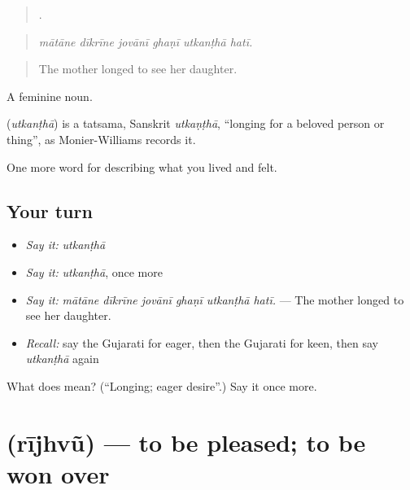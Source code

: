 \begin{quote}
     .
\end{quote}

\begin{quote}
\emph{mātāne dīkrīne jovānī ghaṇī utkanṭhā hatī.}
\end{quote}

\begin{quote}
The mother longed to see her daughter.
\end{quote}

A feminine noun.

\begin{cousinweb}
\textbf{} (\emph{utkanṭhā}) is a tatsama, Sanskrit \emph{utkaṇṭhā}, \textquotedblleft{}longing for a beloved person or thing\textquotedblright{}, as Monier-Williams records it.
\end{cousinweb}

\begin{grammarlens}[title={What you've built}]
One more word for describing what you lived and felt.
\end{grammarlens}

\subsection*{Your turn}
\begin{itemize}
\raggedright
  \item \emph{Say it:} \emph{utkanṭhā}
  \item \emph{Say it:} \emph{utkanṭhā}, once more
  \item \emph{Say it:} \emph{mātāne dīkrīne jovānī ghaṇī utkanṭhā hatī.} — The mother longed to see her daughter.
  \item \emph{Recall:} say the Gujarati for eager, then the Gujarati for keen, then say \emph{utkanṭhā} again
\end{itemize}

\begin{tcolorbox}[breakable,colback=teal!4,colframe=teal!35!black,title={Before you move on}]
What does  mean? (\textquotedblleft{}Longing; eager desire\textquotedblright{}.) Say it once more.
\end{tcolorbox}
\section[\texorpdfstring{\gu{રીઝવું} (rījhvũ)}{રીઝવું (rījhvũ)}]{ (rījhvũ) — to be pleased; to be won over}

